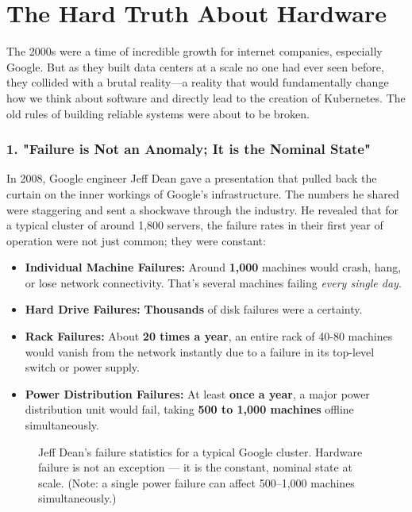 \chapter{The Hard Truth About Hardware}


The 2000s were a time of incredible growth for internet companies, especially Google. But as they built data centers at a scale no one had ever seen before, they collided with a brutal reality---a reality that would fundamentally change how we think about software and directly lead to the creation of Kubernetes. The old rules of building reliable systems were about to be broken.


\subsection{1. "Failure is Not an Anomaly; It is the Nominal State"}


In 2008, Google engineer Jeff Dean gave a presentation that pulled back the curtain on the inner workings of Google's infrastructure. The numbers he shared were staggering and sent a shockwave through the industry. He revealed that for a typical cluster of around 1,800 servers, the failure rates in their first year of operation were not just common; they were constant:

\begin{itemize}
\item \textbf{Individual Machine Failures:} Around \textbf{1,000} machines would crash, hang, or lose network connectivity. That's several machines failing \textit{every single day}.
\item \textbf{Hard Drive Failures:} \textbf{Thousands} of disk failures were a certainty.
\item \textbf{Rack Failures:} About \textbf{20 times a year}, an entire rack of 40-80 machines would vanish from the network instantly due to a failure in its top-level switch or power supply.
\item \textbf{Power Distribution Failures:} At least \textbf{once a year}, a major power distribution unit would fail, taking \textbf{500 to 1,000 machines} offline simultaneously.
\end{itemize}
\begin{figure}[htbp]
\centering

\caption{Jeff Dean's failure statistics for a typical Google cluster. Hardware failure is not an exception --- it is the constant, nominal state at scale. (Note: a single power failure can affect 500–1,000 machines simultaneously.)}
\label{fig:4_1}
\end{figure}




